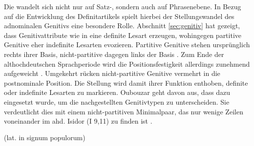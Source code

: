 Die  wandelt sich nicht nur auf Satz-, sondern auch auf  Phrasenebene. In Bezug auf die Entwicklung des Definitartikels  spielt hierbei der Stellungswandel  des adnominalen Genitivs  eine besondere Rolle. Abschnitt \ref{sec:genitiv} hat gezeigt, dass Genitivattribute  wie in  eine definite Lesart erzeugen, wohingegen partitive  Genitive eher indefinite  Lesarten evozieren. Partitive  Genitive stehen  ursprünglich rechts ihrer Basis, nicht-partitive  dagegen links der Basis \parencite[177]{Behaghel1932}. Zum Ende der althochdeutschen Sprachperiode wird die Positionsfestigkeit allerdings zunehmend aufgeweicht \parencite[235]{Oubouzar1997}. Umgekehrt rücken nicht-partitive  Genitive vermehrt in die postnominale Position. Die Stellung  wird damit ihrer Funktion enthoben, definite  oder indefinite  Lesarten zu markieren. Oubouzar geht davon aus, dass  dazu eingesetzt wurde, um die nachgestellten Genitivtypen zu unterscheiden.  Sie verdeutlicht dies mit einem nicht-partitiven  Minimalpaar, das nur wenige Zeilen voneinander im ahd. Isidor (I 9,11) zu finden ist \parencite[vgl.][79]{Oubouzar1992}.  
 

\begin{exe}
	\ex \label{ex:genitiv-stellung}  (lat. in signum populorum)
	\begin{xlist} 
		\ex \label{ex:gen-prae}   
		\ex \label{ex:gen-post}  		
		\end{xlist}
\end{exe}

